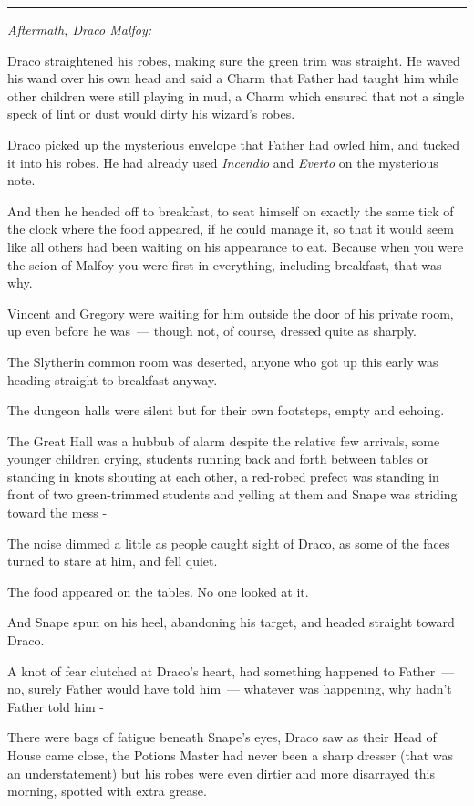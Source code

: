 \begin{center}\rule{3in}{0.4pt}\end{center}

\emph{Aftermath, Draco Malfoy:}

Draco straightened his robes, making sure the green trim was straight. He waved his wand over his own head and said a Charm that Father had taught him while other children were still playing in mud, a Charm which ensured that not a single speck of lint or dust would dirty his wizard's robes.

Draco picked up the mysterious envelope that Father had owled him, and tucked it into his robes. He had already used \emph{Incendio} and \emph{Everto} on the mysterious note.

And then he headed off to breakfast, to seat himself on exactly the same tick of the clock where the food appeared, if he could manage it, so that it would seem like all others had been waiting on his appearance to eat. Because when you were the scion of Malfoy you were first in everything, including breakfast, that was why.

Vincent and Gregory were waiting for him outside the door of his private room, up even before he was~--- though not, of course, dressed quite as sharply.

The Slytherin common room was deserted, anyone who got up this early was heading straight to breakfast anyway.

The dungeon halls were silent but for their own footsteps, empty and echoing.

The Great Hall was a hubbub of alarm despite the relative few arrivals, some younger children crying, students running back and forth between tables or standing in knots shouting at each other, a red-robed prefect was standing in front of two green-trimmed students and yelling at them and Snape was striding toward the mess -

The noise dimmed a little as people caught sight of Draco, as some of the faces turned to stare at him, and fell quiet.

The food appeared on the tables. No one looked at it.

And Snape spun on his heel, abandoning his target, and headed straight toward Draco.

A knot of fear clutched at Draco's heart, had something happened to Father~--- no, surely Father would have told him~--- whatever was happening, why hadn't Father told him -

There were bags of fatigue beneath Snape's eyes, Draco saw as their Head of House came close, the Potions Master had never been a sharp dresser (that was an understatement) but his robes were even dirtier and more disarrayed this morning, spotted with extra grease.

